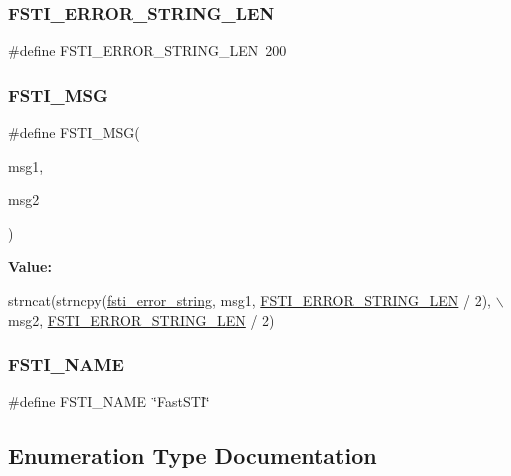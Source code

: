 \subsubsection{\texorpdfstring{F\+S\+T\+I\+\_\+\+E\+R\+R\+O\+R\+\_\+\+S\+T\+R\+I\+N\+G\+\_\+\+L\+EN}{FSTI\_ERROR\_STRING\_LEN}}
{\footnotesize\ttfamily \#define F\+S\+T\+I\+\_\+\+E\+R\+R\+O\+R\+\_\+\+S\+T\+R\+I\+N\+G\+\_\+\+L\+EN~200}

\mbox{\label{fsti-error_8h_a4452fa8cf807a9553fa2efefb62290c7}} 
\subsubsection{\texorpdfstring{F\+S\+T\+I\+\_\+\+M\+SG}{FSTI\_MSG}}
{\footnotesize\ttfamily \#define F\+S\+T\+I\+\_\+\+M\+SG(\begin{DoxyParamCaption}\item[{}]{msg1,  }\item[{}]{msg2 }\end{DoxyParamCaption})}

{\bfseries Value\+:}
\begin{DoxyCode}
strncat(strncpy(\mbox{\hyperlink{fsti-error_8h_a99f70ec33b72be8e72a89fc904bcdb36}{fsti\_error\_string}}, msg1, \mbox{\hyperlink{fsti-error_8h_a2c5ec410c3efe4eab60017e594b33bbf}{FSTI\_ERROR\_STRING\_LEN}} / 2), 
      \(\backslash\)
           msg2, \mbox{\hyperlink{fsti-error_8h_a2c5ec410c3efe4eab60017e594b33bbf}{FSTI\_ERROR\_STRING\_LEN}} / 2)
\end{DoxyCode}
\mbox{\label{fsti-error_8h_a923bc1a165ace97dbebe85f8d7edc11f}} 
\subsubsection{\texorpdfstring{F\+S\+T\+I\+\_\+\+N\+A\+ME}{FSTI\_NAME}}
{\footnotesize\ttfamily \#define F\+S\+T\+I\+\_\+\+N\+A\+ME~\char`\"{}Fast\+S\+TI\char`\"{}}



\subsection{Enumeration Type Documentation}
\mbox{\label{fsti-error_8h_a385c44f6fb256e5716a2302a5b940388}} 
